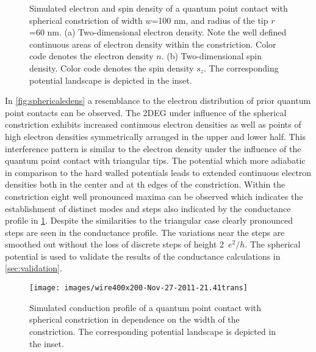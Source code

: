 \begin{figure}[h!]
  \hspace{14pt}
  \hspace{4pt}
  \caption{Simulated electron and spin density of a quantum point contact with spherical constriction of width $w$=100 nm, and radius of the tip $r$=60 nm. (a) Two-dimensional electron density. Note the well defined continuous areas of electron density within the constriction. Color code denotes the electron density $n$. (b) Two-dimensional spin density. Color code denotes the spin density $s_z$. The corresponding potential landscape is depicted in the inset.}
\end{figure}
In \cref{fig:sphericaledens} a resemblance to the electron distribution of prior quantum point contacts can be observed. The 2DEG under influence of the spherical constriction exhibits increased continuous electron densities as well as points of high electron densities symmetrically arranged in the upper and lower half. This interference pattern is similar to the electron density under the influence of the quantum point contact with triangular tips. The potential which more adiabatic in comparison to the hard walled potentials leads to extended continuous electron densities both in the center and at th edges of the constriction. Within the constriction eight well pronounced maxima can be observed which indicates the establishment of distinct modes and steps also indicated by the conductance profile in \cref{fig:sphericaltrans}. Despite the similarities to the triangular case clearly pronounced steps are seen in the conductance profile. The variations near the steps are smoothed out without the loss of discrete steps of height 2~$e^2/h$.  The spherical potential is used to validate the results of the conductance calculations in \cref{sec:validation}.\par
\begin{figure}[h]
  \centering
  \texttt{[image: images/wire400x200-Nov-27-2011-21.41trans]}
  \caption{Simulated conduction profile of a quantum point contact with spherical constriction in dependence on the width of the constriction. The corresponding potential landscape is depicted in the inset.}\label{fig:sphericaltrans}
\end{figure}
